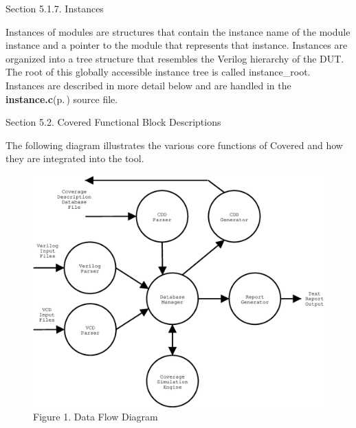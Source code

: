 \begin{Desc}
\item[Section 5.1.7. Instances]\end{Desc}
\begin{Desc}
\item[]Instances of modules are structures that contain the instance name of the module instance and a pointer to the module that represents that instance. Instances are organized into a tree structure that resembles the Verilog hierarchy of the DUT. The root of this globally accessible instance tree is called instance\_\-root. Instances are described in more detail below and are handled in the {\bf instance.c}{\rm (p.\,\pageref{instance_8c})} source file.\end{Desc}




\begin{Desc}
\item[Section 5.2. Covered Functional Block Descriptions]\end{Desc}
\begin{Desc}
\item[]The following diagram illustrates the various core functions of Covered and how they are integrated into the tool.\end{Desc}
 \begin{figure}[H]
\begin{center}
\includegraphics{big_picture}\caption{Figure 1. Data Flow Diagram}
\end{center}
\end{figure}
